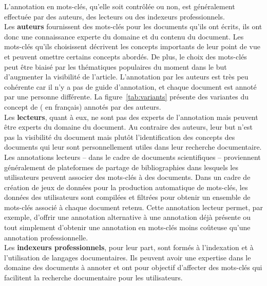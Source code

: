 


L'annotation en mots-clés, qu'elle soit contrôlée ou non, est généralement effectuée par des auteurs, des lecteurs ou des indexeurs professionnels.\\
Les \textbf{auteurs} fournissent des mots-clés pour les documents qu'ils ont écrits, ils ont donc une connaissance experte du domaine et du contenu du document.
Les mots-clés qu'ils choisissent décrivent les concepts importants de leur point de vue et peuvent omettre certains concepts abordés.
De plus, le choix des mots-clés peut être biaisé par les thématiques populaires du moment dans le but d'augmenter la visibilité de l'article.
L'annotation par les auteurs est très peu cohérente car il n'y a pas de guide d'annotation, et chaque document est annoté par une personne différente.
La figure~\ref{tab:variants} présente des variantes du concept de  ( en français) annotés par des auteurs.\\
Les \textbf{lecteurs}, quant à eux, ne sont pas des experts de l'annotation mais peuvent être experts du domaine du document. Au contraire des auteurs, leur but n'est pas la visibilité du document mais plutôt l'identification des concepts des documents qui leur sont personnellement utiles dans leur recherche documentaire.
Les annotations lecteurs -- dans le cadre de documents scientifiques -- proviennent généralement de plateformes de partage de bibliographies dans lesquels les utilisateurs peuvent associer des mots-clés à des documents.
Dans un cadre de création de jeux de données pour la production automatique de mots-clés, les données des utilisateurs sont compilées et filtrées pour obtenir un ensemble de mots-clés associé à chaque document retenu.
Cette annotation lecteur permet, par exemple, d'offrir une annotation alternative à une annotation déjà présente ou tout simplement d'obtenir une annotation en mots-clés moins coûteuse qu'une annotation professionnelle.\\
Les \textbf{indexeurs professionnels}, pour leur part, sont formés à l'indexation et à l'utilisation de langages documentaires.
Ils peuvent avoir une expertise dans le domaine des documents à annoter et ont pour objectif d'affecter des mots-clés qui facilitent la recherche documentaire pour les utilisateurs.



